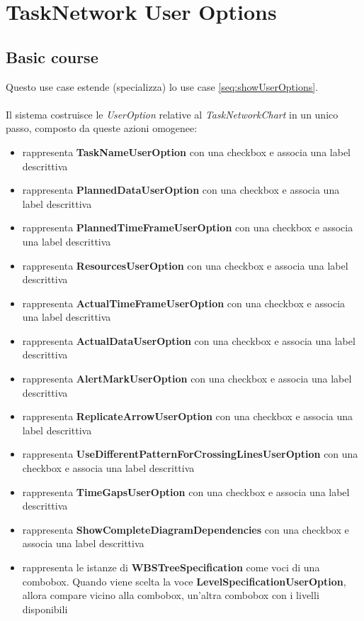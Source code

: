 \section{TaskNetwork User Options}
\label{seq:tNUserOption}
\subsection{Basic course}
Questo use case estende (specializza) lo use case \ref{seq:showUserOptions}.
\\ \\
Il sistema costruisce le \emph{UserOption} relative al \emph{TaskNetworkChart}
in un unico passo, composto da queste azioni omogenee:
\begin{itemize}
  \item rappresenta \textbf{TaskNameUserOption} con una checkbox e associa una
  label descrittiva
  \item rappresenta \textbf{PlannedDataUserOption} con una checkbox e associa una
  label descrittiva
  \item rappresenta \textbf{PlannedTimeFrameUserOption} con una checkbox e associa una
  label descrittiva
  \item rappresenta \textbf{ResourcesUserOption} con una checkbox e associa una
  label descrittiva
  \item rappresenta \textbf{ActualTimeFrameUserOption} con una checkbox e associa una
  label descrittiva
  \item rappresenta \textbf{ActualDataUserOption} con una checkbox e associa una
  label descrittiva
  \item rappresenta \textbf{AlertMarkUserOption} con una checkbox e associa una
  label descrittiva
  \item rappresenta \textbf{ReplicateArrowUserOption} con una checkbox e associa una
  label descrittiva
  \item rappresenta \textbf{UseDifferentPatternForCrossingLinesUserOption} con una checkbox e associa una
  label descrittiva
  \item rappresenta \textbf{TimeGapsUserOption} con una checkbox e associa una
  label descrittiva
  \item rappresenta \textbf{ShowCompleteDiagramDependencies} con una checkbox e associa una
  label descrittiva
  \item rappresenta le istanze di \textbf{WBSTreeSpecification} come voci di una
  combobox. Quando viene scelta la voce \textbf{LevelSpecificationUserOption}, allora
  compare vicino alla combobox, un'altra combobox con i livelli disponibili

\end{itemize}
